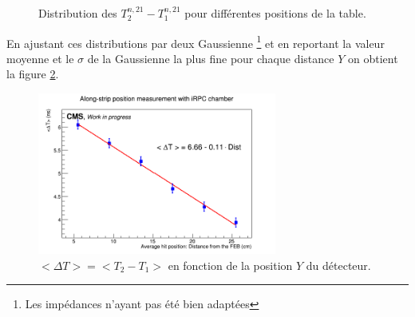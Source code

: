 \begin{figure}[ht!]
	\hfill
	\caption{Distribution des $T^{n,21}_2-T^{n,21}_1$ pour différentes positions de la table.}
	\label{move}
\end{figure}

En ajustant ces distributions par deux Gaussienne \footnote{Les impédances n'ayant pas été bien adaptées} et en reportant la valeur moyenne et le $\sigma$ de la Gaussienne la plus fine pour chaque distance $Y$ on obtient la figure \ref{Fit}.

\begin{figure}[!ht]
	\centering
	\includegraphics[width=0.7\textwidth]{ELE/MeanT_Pos.jpg}
	\caption{$<\Delta T>=<T_2-T_1>$ en fonction de la position $Y$ du détecteur.}
	\label{Fit}
\end{figure}

